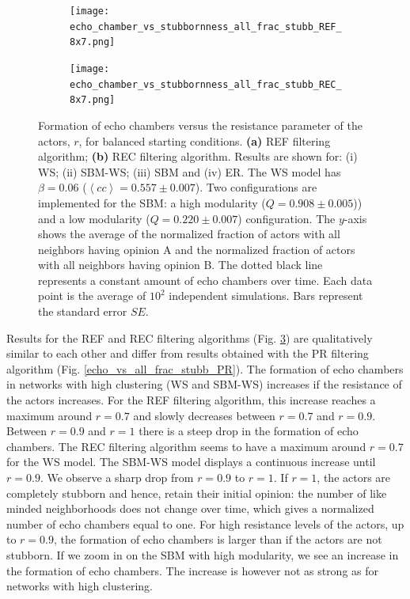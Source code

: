 \documentclass[11 pt , letterpaper , twoside , openright]{book}
\begin{document}
\begin{figure}[H]
  \begin{subfigure}[b]{0.49\textwidth}
    \caption{}
  	\texttt{[image: echo\_chamber\_vs\_stubbornness\_all\_frac\_stubb\_REF\_8x7.png]}
    \label{REF_all_frac_stubb}
  \end{subfigure}
  \begin{subfigure}[b]{0.49\textwidth}
    \caption{}
  	\texttt{[image: echo\_chamber\_vs\_stubbornness\_all\_frac\_stubb\_REC\_8x7.png]}
    \label{REC_all_frac_stubb}
  \end{subfigure}
  \captionsetup{format=plain}
  \caption[Formation of echo chambers versus the resistance parameter of the actors, $r$, for balanced starting conditions. The REF and REC filtering algorithms are used]{Formation of echo chambers versus the resistance parameter of the actors, $r$, for balanced starting conditions. \textbf{(a)} REF filtering algorithm; \textbf{(b)} REC filtering algorithm. Results are shown for: (i) WS; (ii) SBM-WS; (iii) SBM and (iv) ER. The WS model has $\beta = 0.06$ ($\left<cc\right> = 0.557 \pm 0.007$). Two configurations are implemented for the SBM: a high modularity ($Q = 0.908 \pm 0.005$)) and a low modularity ($Q = 0.220 \pm 0.007$) configuration. The $y$-axis shows the average of the normalized fraction of actors with all neighbors having opinion A and the normalized fraction of actors with all neighbors having opinion B. The dotted black line represents a constant amount of echo chambers over time. Each data point is the average of $10^2$ independent simulations. Bars represent the standard error $SE$.}
\label{echo_vs_all_frac_stubb_REF-REC}
\end{figure}
\noindent
Results for the REF and REC filtering algorithms (Fig. \ref{echo_vs_all_frac_stubb_REF-REC}) are qualitatively similar to each other and differ from results obtained with the PR filtering algorithm (Fig. \ref{echo_vs_all_frac_stubb_PR}). The formation of echo chambers in networks with high clustering (WS and SBM-WS) increases if the resistance of the actors increases. For the REF filtering algorithm, this increase reaches a maximum around $r = 0.7$ and slowly decreases between $r = 0.7$ and $r = 0.9$. Between $r = 0.9$ and $r=1$ there is a steep drop in the formation of echo chambers. The REC filtering algorithm seems to have a maximum around $r = 0.7$ for the WS model. The SBM-WS model displays a continuous increase until $r = 0.9$. We observe a sharp drop from $r = 0.9$ to $r=1$. If $r=1$, the actors are completely stubborn and hence, retain their initial opinion: the number of like minded neighborhoods does not change over time, which gives a normalized number of echo chambers equal to one. For high resistance levels of the actors, up to $r = 0.9$, the formation of echo chambers is larger than if the actors are not stubborn. If we zoom in on the SBM with high modularity, we see an increase in the formation of echo chambers. The increase is however not as strong as for networks with high clustering.\\
\end{document}
